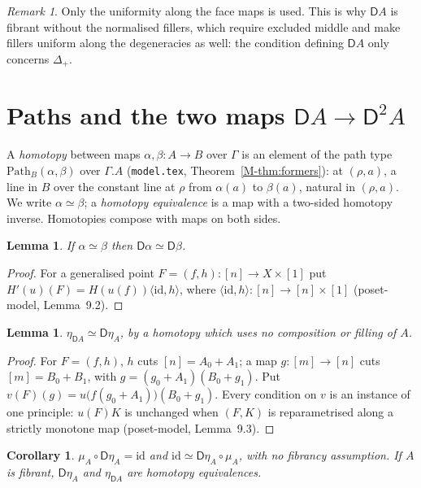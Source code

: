 \documentclass[11pt]{article}
\newcommand{\Path}{\mathrm{Path}}
\newcommand{\id}{\mathrm{id}}
\newcommand{\D}{\mathsf{D}}
\theoremstyle{plain}
\newtheorem{lemma}[theorem]{Lemma}
\newtheorem{corollary}[theorem]{Corollary}
\theoremstyle{definition}
\theoremstyle{remark}
\newtheorem{remark}[theorem]{Remark}
\begin{document}
\begin{remark}
Only the uniformity along the face maps is used. This is why $\D A$ is fibrant
without the normalised fillers, which require excluded middle and make
fillers uniform along the degeneracies as well: the condition defining
$\D A$ only concerns $\Delta_+$.
\end{remark}

\section{Paths and the two maps $\D A\to\D^2A$}\label{sec:paths}

A \emph{homotopy} between maps $\alpha,\beta:A\to B$ over $\Gamma$ is an
element of the path type $\Path_{B}(\alpha,\beta)$ over $\Gamma.A$
(\texttt{model.tex}, Theorem~\ref{M-thm:formers}): at $(\rho,a)$, a line in
$B$ over the constant line at $\rho$ from $\alpha(a)$ to $\beta(a)$, natural in
$(\rho,a)$. We write $\alpha\simeq\beta$; a \emph{homotopy equivalence} is a
map with a two-sided homotopy inverse. Homotopies compose with maps on both
sides.

\begin{lemma}\label{lem:D-htpy}
If $\alpha\simeq\beta$ then $\D\alpha\simeq\D\beta$.
\end{lemma}

\begin{proof}
For a generalised point $F=(f,h):[n]\to X\times[1]$ put
$H'(u)(F)=H(u(f))\langle\id,h\rangle$, where $\langle\id,h\rangle:[n]\to
[n]\times[1]$ (poset-model, Lemma~9.2).
\end{proof}

\begin{lemma}\label{lem:eta-path}
$\eta_{\D A}\simeq\D\eta_A$, by a homotopy which uses no composition or
filling of $A$.
\end{lemma}

\begin{proof}
For $F=(f,h)$, $h$ cuts $[n]=A_0+A_1$; a map $g:[m]\to[n]$ cuts
$[m]=B_0+B_1$, with $g=(g_0+A_1)(B_0+g_1)$. Put
$v(F)(g)=u\bigl(f(g_0+A_1)\bigr)(B_0+g_1)$. Every condition on $v$ is an
instance of one principle: $u(F)K$ is unchanged when $(F,K)$ is
reparametrised along a strictly monotone map (poset-model, Lemma~9.3).
\end{proof}

\begin{corollary}\label{cor:eq}
$\mu_A\circ\D\eta_A=\id$ and $\id\simeq\D\eta_A\circ\mu_A$, with no
fibrancy assumption. If $A$ is fibrant, $\D\eta_A$ and $\eta_{\D A}$ are
homotopy equivalences.
\end{corollary}
\end{document}
